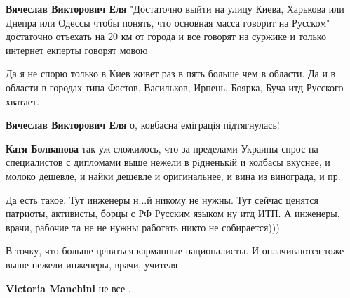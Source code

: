 \begin{itemize}
\begin{itemize}


\textbf{Вячеслав Викторович Еля} "Достаточно выйти на улицу Киева, Харькова или
Днепра или Одессы чтобы понять, что основная масса говорит на Русском"
достаточно отъехать на 20 км от города и все говорят на суржике и только
интернет екперты говорят мовою


Да я не спорю только в Киев живет раз в пять больше чем в области. Да и в
области в городах типа Фастов, Васильков, Ирпень, Боярка, Буча итд Русского
хватает.


\textbf{Вячеслав Викторович Еля} о, ковбасна еміграція підтягнулась!


\textbf{Катя Болванова} так уж сложилось, что за пределами Украины спрос на
специалистов с дипломами выше нежели в рiдненькiй и колбасы вкуснее, и молоко
дешевле, и найки дешевле и оригинальнее, и вина из винограда, и пр.


Да есть такое. Тут инженеры н...й никому не нужны. Тут сейчас ценятся патриоты, активисты, борцы с РФ Русским языком ну итд ИТП. А инженеры, врачи, рабочие та не не нужны работать никто не собирается)))


В точку, что больше ценяться карманные националисты. И оплачиваются тоже выше нежели инженеры, врачи, учителя


\textbf{Victoria Manchini} не все .



\end{itemize}
\end{itemize}
